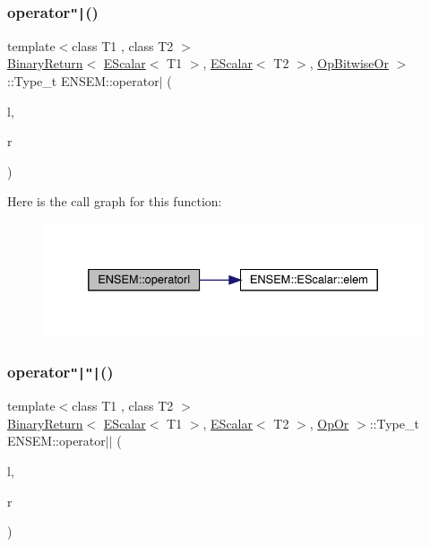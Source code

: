 \subsubsection{\texorpdfstring{operator\texttt{"|}()}{operator|()}}
{\footnotesize\ttfamily template$<$class T1 , class T2 $>$ \\
\mbox{\hyperlink{structENSEM_1_1BinaryReturn}{Binary\+Return}}$<$ \mbox{\hyperlink{classENSEM_1_1EScalar}{E\+Scalar}}$<$ T1 $>$, \mbox{\hyperlink{classENSEM_1_1EScalar}{E\+Scalar}}$<$ T2 $>$, \mbox{\hyperlink{structENSEM_1_1OpBitwiseOr}{Op\+Bitwise\+Or}} $>$\+::Type\+\_\+t E\+N\+S\+E\+M\+::operator$\vert$ (\begin{DoxyParamCaption}\item[{const \mbox{\hyperlink{classENSEM_1_1EScalar}{E\+Scalar}}$<$ T1 $>$ \&}]{l,  }\item[{const \mbox{\hyperlink{classENSEM_1_1EScalar}{E\+Scalar}}$<$ T2 $>$ \&}]{r }\end{DoxyParamCaption})\hspace{0.3cm}{\ttfamily [inline]}}

Here is the call graph for this function\+:
\nopagebreak
\begin{figure}[H]
\begin{center}
\leavevmode
\includegraphics[width=332pt]{d4/dca/group__escalar_gadc4bc2eaed30b8d8661741f6ece0de03_cgraph}
\end{center}
\end{figure}
\mbox{\label{group__escalar_gadede5cc3683f39a01170f32e3f759c8e}} 
\subsubsection{\texorpdfstring{operator\texttt{"|}\texttt{"|}()}{operator||()}}
{\footnotesize\ttfamily template$<$class T1 , class T2 $>$ \\
\mbox{\hyperlink{structENSEM_1_1BinaryReturn}{Binary\+Return}}$<$ \mbox{\hyperlink{classENSEM_1_1EScalar}{E\+Scalar}}$<$ T1 $>$, \mbox{\hyperlink{classENSEM_1_1EScalar}{E\+Scalar}}$<$ T2 $>$, \mbox{\hyperlink{structENSEM_1_1OpOr}{Op\+Or}} $>$\+::Type\+\_\+t E\+N\+S\+E\+M\+::operator$\vert$$\vert$ (\begin{DoxyParamCaption}\item[{const \mbox{\hyperlink{classENSEM_1_1EScalar}{E\+Scalar}}$<$ T1 $>$ \&}]{l,  }\item[{const \mbox{\hyperlink{classENSEM_1_1EScalar}{E\+Scalar}}$<$ T2 $>$ \&}]{r }\end{DoxyParamCaption})\hspace{0.3cm}{\ttfamily [inline]}}

